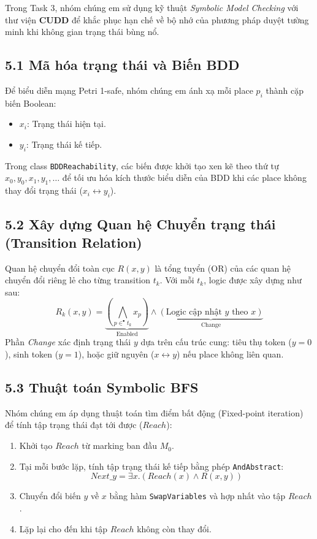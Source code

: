 \documentclass[12pt,a4paper]{article}
\begin{document}
Trong Task 3, nhóm chúng em sử dụng kỹ thuật \textit{Symbolic Model Checking} với thư viện \textbf{CUDD} để khắc phục hạn chế về bộ nhớ của phương pháp duyệt tường minh khi không gian trạng thái bùng nổ.

\subsection*{5.1 Mã hóa trạng thái và Biến BDD}
Để biểu diễn mạng Petri 1-safe, nhóm chúng em ánh xạ mỗi place $p_i$ thành cặp biến Boolean:
\begin{itemize}
    \item $x_i$: Trạng thái hiện tại.
    \item $y_i$: Trạng thái kế tiếp.
\end{itemize}
Trong class \texttt{BDDReachability}, các biến được khởi tạo xen kẽ theo thứ tự $x_0, y_0, x_1, y_1, \dots$ để tối ưu hóa kích thước biểu diễn của BDD khi các place không thay đổi trạng thái ($x_i \leftrightarrow y_i$).

\subsection*{5.2 Xây dựng Quan hệ Chuyển trạng thái (Transition Relation)}
Quan hệ chuyển đổi toàn cục $R(x, y)$ là tổng tuyển (OR) của các quan hệ chuyển đổi riêng lẻ cho từng transition $t_k$. Với mỗi $t_k$, logic được xây dựng như sau:
\[ R_k(x, y) = \underbrace{(\bigwedge_{p \in ^\bullet t_k} x_p)}_{\text{Enabled}} \wedge \underbrace{(\text{Logic cập nhật } y \text{ theo } x)}_{\text{Change}} \]
Phần \textit{Change} xác định trạng thái $y$ dựa trên cấu trúc cung: tiêu thụ token ($y=0$), sinh token ($y=1$), hoặc giữ nguyên ($x \leftrightarrow y$) nếu place không liên quan.

\subsection*{5.3 Thuật toán Symbolic BFS}
Nhóm chúng em áp dụng thuật toán tìm điểm bất động (Fixed-point iteration) để tính tập trạng thái đạt tới được ($Reach$):
\begin{enumerate}
    \item Khởi tạo $Reach$ từ marking ban đầu $M_0$.
    \item Tại mỗi bước lặp, tính tập trạng thái kế tiếp bằng phép \texttt{AndAbstract}:
    \[ Next\_y = \exists x . (Reach(x) \wedge R(x, y)) \]
    \item Chuyển đổi biến $y$ về $x$ bằng hàm \texttt{SwapVariables} và hợp nhất vào tập $Reach$.
    \item Lặp lại cho đến khi tập $Reach$ không còn thay đổi.
\end{enumerate}
\end{document}
